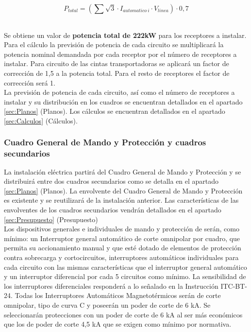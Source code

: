 $$P_{total}=\left( \sum \sqrt 3 \cdot I_{automatico\ i}\cdot  {V_{linea}}\right)\cdot 0,7$$\

Se obtiene un valor de {\bfseries potencia total de 222kW} para los receptores a instalar.\\

Para el cálculo la previsión de potencia de cada circuito se multiplicará la potencia nominal demandada por cada receptor por el número de receptores a instalar. Para circuito de las cintas transportadoras se aplicará un factor de corrección de 1,5 a la potencia total. Para el resto de receptores el factor de corrección será 1. \\

La previsión de potencia de cada circuito, así como el número de receptores a instalar y su distribución en los cuadros se encuentran detallados en el apartado \ref{sec:Planos} (Planos). Los cálculos se encuentran detallados en el apartado \ref{sec:Calculos} (Cálculos). 

\subsubsection{Cuadro General de Mando y Protección y cuadros secundarios}

La instalación eléctrica partirá del Cuadro General de Mando y Protección y se distribuirá entre dos cuadros secundarios como se detalla en el apartado \ref{sec:Planos} (Planos). La envolvente del Cuadro General de Mando y Protección es existente y se reutilizará de la instalación anterior. Las características de las envolventes de los cuadros secundarios vendrán detallados en el apartado \ref{sec:Presupuesto} (Presupuesto)\\

Los dispositivos generales e individuales de mando y protección de serán, como mínimo: un Interruptor general automático de corte omnipolar por cuadro, que permita su accionamiento manual y que esté dotado de elementos de protección contra sobrecarga y cortocircuitos, interruptores automáticos individuales para cada circuito con las mismas características que el interruptor general automático y un interruptor diferencial por cada 5 circuitos como mínimo. La sensibilidad de los interruptores diferenciales responderá a lo señalado en la Instrucción ITC-BT-24. Todas los Interruptores Automáticos Magnetotérmicos serán de corte omnipolar, tipo de curva C y poseerán un poder de corte de 6 kA. Se seleccionarán protecciones con un poder de corte de 6 kA al ser más económicos que los de poder de corte 4,5 kA que se exigen como mínimo por normativa.\\

